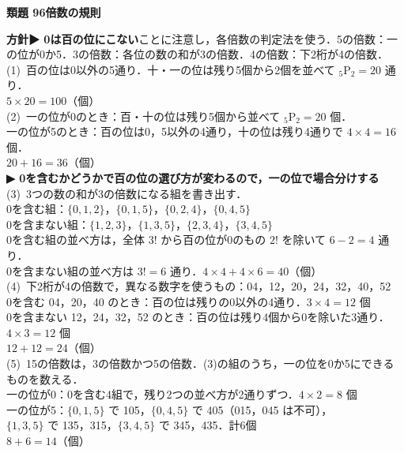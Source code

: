 \documentclass[a4paper,11pt]{ltjsarticle}
\newcommand{\ans}[2]{\Needspace{5\baselineskip}\vspace{6pt}%
  {\sffamily\bfseries 類題 #1\quad #2}\par}
\newcommand{\point}[1]{\textsf{\bfseries ▶ #1}}
\begin{document}
\ans{96}{倍数の規則}
\begin{kai}
\textbf{方針}\quad \point{0は百の位にこない}ことに注意し，各倍数の判定法を使う．5の倍数：一の位が0か5．3の倍数：各位の数の和が3の倍数．4の倍数：下2桁が4の倍数．\\[2pt]
(1)\ 百の位は0以外の5通り．十・一の位は残り5個から2個を並べて ${}_5\mathrm P_2=20$ 通り．\\
\hspace*{1.5em}$5\times20=100$（個）\\[2pt]
(2)\ 一の位が0のとき：百・十の位は残り5個から並べて ${}_5\mathrm P_2=20$ 個．\\
\hspace*{1.5em}一の位が5のとき：百の位は0，5以外の4通り，十の位は残り4通りで $4\times4=16$ 個．\\
\hspace*{1.5em}$20+16=36$（個）\\
\hspace*{1.5em}\point{0を含むかどうかで百の位の選び方が変わるので，一の位で場合分けする}\\[2pt]
(3)\ 3つの数の和が3の倍数になる組を書き出す．\\
\hspace*{1.5em}0を含む組：$\{0,1,2\}$，$\{0,1,5\}$，$\{0,2,4\}$，$\{0,4,5\}$\\
\hspace*{1.5em}0を含まない組：$\{1,2,3\}$，$\{1,3,5\}$，$\{2,3,4\}$，$\{3,4,5\}$\\
\hspace*{1.5em}0を含む組の並べ方は，全体 $3!$ から百の位が0のもの $2!$ を除いて $6-2=4$ 通り．\\
\hspace*{1.5em}0を含まない組の並べ方は $3!=6$ 通り．\quad $4\times4+4\times6=40$（個）\\[2pt]
(4)\ 下2桁が4の倍数で，異なる数字を使うもの：04，12，20，24，32，40，52\\
\hspace*{1.5em}0を含む 04，20，40 のとき：百の位は残りの0以外の4通り．$3\times4=12$ 個\\
\hspace*{1.5em}0を含まない 12，24，32，52 のとき：百の位は残り4個から0を除いた3通り．$4\times3=12$ 個\\
\hspace*{1.5em}$12+12=24$（個）\\[2pt]
(5)\ 15の倍数は，3の倍数かつ5の倍数．(3)の組のうち，一の位を0か5にできるものを数える．\\
\hspace*{1.5em}一の位が0：0を含む4組で，残り2つの並べ方が2通りずつ．$4\times2=8$ 個\\
\hspace*{1.5em}一の位が5：$\{0,1,5\}$ で 105，$\{0,4,5\}$ で 405（015，045 は不可），\\
\hspace*{1.5em}$\{1,3,5\}$ で 135，315，$\{3,4,5\}$ で 345，435．計6個\\
\hspace*{1.5em}$8+6=14$（個）
\end{kai}
\end{document}
